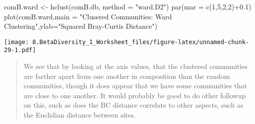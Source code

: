 \documentclass[
]{article}
\newenvironment{Shaded}{\begin{snugshade}}{\end{snugshade}}
\newcommand{\AttributeTok}[1]{\textcolor[rgb]{0.77,0.63,0.00}{#1}}
\newcommand{\DecValTok}[1]{\textcolor[rgb]{0.00,0.00,0.81}{#1}}
\newcommand{\FloatTok}[1]{\textcolor[rgb]{0.00,0.00,0.81}{#1}}
\newcommand{\FunctionTok}[1]{\textcolor[rgb]{0.00,0.00,0.00}{#1}}
\newcommand{\NormalTok}[1]{#1}
\newcommand{\OtherTok}[1]{\textcolor[rgb]{0.56,0.35,0.01}{#1}}
\newcommand{\SpecialCharTok}[1]{\textcolor[rgb]{0.00,0.00,0.00}{#1}}
\newcommand{\StringTok}[1]{\textcolor[rgb]{0.31,0.60,0.02}{#1}}
\begin{document}
\begin{Shaded}
\begin{Highlighting}[]
\NormalTok{comB.ward }\OtherTok{\textless{}{-}} \FunctionTok{hclust}\NormalTok{(comB.db, }\AttributeTok{method =} \StringTok{"ward.D2"}\NormalTok{)}
\FunctionTok{par}\NormalTok{(}\AttributeTok{mar =} \FunctionTok{c}\NormalTok{(}\DecValTok{1}\NormalTok{,}\DecValTok{5}\NormalTok{,}\DecValTok{2}\NormalTok{,}\DecValTok{2}\NormalTok{)}\SpecialCharTok{+}\FloatTok{0.1}\NormalTok{)}
\FunctionTok{plot}\NormalTok{(comB.ward,}\AttributeTok{main =} \StringTok{"Clusered Communities: Ward Clustering"}\NormalTok{,}\AttributeTok{ylab=}\StringTok{"Squared Bray{-}Curtis Distance"}\NormalTok{)}
\end{Highlighting}
\end{Shaded}

\texttt{[image: 8.BetaDiversity\_1\_Worksheet\_files/figure-latex/unnamed-chunk-29-1.pdf]}

\begin{quote}
We see that by looking at the axis values, that the clustered
communities are farther apart from one another in composition than the
random communities, though it does appear that we have some communities
that are close to one another. It would probably be good to do other
followup on this, such as does the BC distance correlate to other
aspects, such as the Euclidian distance between sites.
\end{quote}
\end{document}
